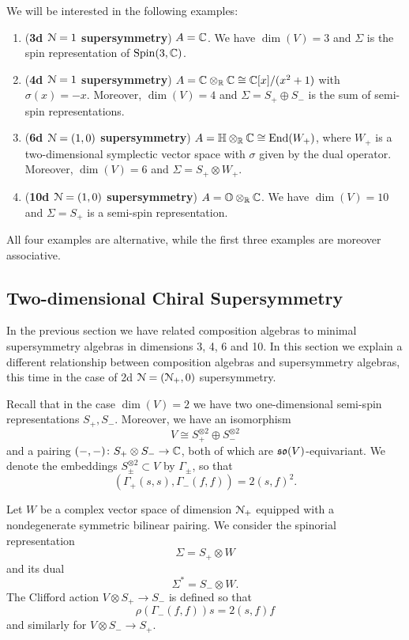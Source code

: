 \documentclass[10pt, oneside]{article}
\begin{document}
We will be interested in the following examples:
\begin{enumerate}
\item (\textbf{3d $\mathcal{N}=1$ supersymmetry}) $A = \mathbb C$. We have $\dim(V) = 3$ and $\Sigma$ is the spin representation of $\mathrm{Spin}(3, \mathbb C)$.

\item (\textbf{4d $\mathcal{N}=1$ supersymmetry}) $A = \mathbb C\otimes_{\mathbb R}\mathbb C\cong \mathbb C[x]/(x^2+1)$ with $\sigma(x) = -x$. Moreover, $\dim(V) = 4$ and $\Sigma=S_+\oplus S_-$ is the sum of semi-spin representations.

\item (\textbf{6d $\mathcal{N}=(1, 0)$ supersymmetry}) $A=\mathbb{H}\otimes_{\mathbb R}\mathbb C\cong \operatorname{End}(W_+)$, where $W_+$ is a two-dimensional symplectic vector space with $\sigma$ given by the dual operator. Moreover, $\dim(V) = 6$ and $\Sigma = S_+\otimes W_+$.

\item (\textbf{10d $\mathcal{N}=(1, 0)$ supersymmetry}) $A=\mathbb{O}\otimes_{\mathbb R}\mathbb C$. We have $\dim(V) = 10$ and $\Sigma = S_+$ is a semi-spin representation.
\end{enumerate}

All four examples are alternative, while the first three examples are moreover associative.

\subsection{Two-dimensional Chiral Supersymmetry} \label{sect:2dchiral}

In the previous section we have related composition algebras to minimal supersymmetry algebras in dimensions 3, 4, 6 and 10. In this section we explain a different relationship between composition algebras and supersymmetry algebras, this time in the case of 2d $\mathcal N=(\mathcal N_+, 0)$ supersymmetry.

Recall that in the case $\dim(V) = 2$ we have two one-dimensional semi-spin representations $S_+, S_-$. Moreover, we have an isomorphism
\[V\cong S_+^{\otimes 2}\oplus S_-^{\otimes 2}\]
and a pairing $( -, -)\colon S_+\otimes S_-\rightarrow \mathbb C$, both of which are $\mathfrak{so}(V)$-equivariant. We denote the embeddings $S_{\pm}^{\otimes 2}\subset V$ by $\Gamma_{\pm}$, so that
\begin{equation}
(\Gamma_+(s, s), \Gamma_-(f, f)) = 2(s, f)^2.
\label{eq:2dvectorpairing}
\end{equation}

Let $W$ be a complex vector space of dimension $\mathcal N_+$ equipped with a nondegenerate symmetric bilinear pairing. We consider the spinorial representation
\[\Sigma = S_+\otimes W\]
and its dual
\[\Sigma^* = S_-\otimes W.\]
The Clifford action $V\otimes S_+\rightarrow S_-$ is defined so that
\[\rho(\Gamma_-(f, f)) s = 2(s, f) f\]
and similarly for $V\otimes S_-\rightarrow S_+$.
\end{document}
